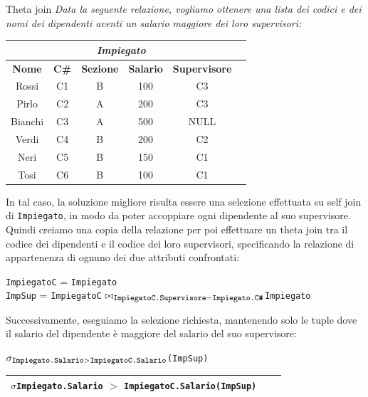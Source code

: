 \begin{Example}{Theta join}{}
    \textit{Data la seguente relazione, vogliamo ottenere una lista dei codici e dei nomi dei dipendenti aventi un salario maggiore dei loro supervisori:}
     \begin{center}
        \begin{tabular}{|c|c|c|c|c|c|}
            \hline\multicolumn{5}{|c|}{\textit{Impiegato}}\\\hline
            \textbf{Nome} & \textbf{C\#} & \textbf{Sezione} & \textbf{Salario} & \textbf{Supervisore}\\\hline
            Rossi & C1 & B & 100 & C3\\
            Pirlo & C2 & A & 200 & C3\\
            Bianchi & C3 & A & 500 & NULL\\
            Verdi & C4 & B & 200 & C2\\
            Neri & C5 & B & 150 & C1\\
            Tosi & C6 & B & 100 & C1\\\hline
        \end{tabular}
    \end{center}
    In tal caso, la soluzione migliore risulta essere una selezione effettuata su self join di \verb|Impiegato|, in modo da poter accoppiare ogni dipendente al suo supervisore. Quindi creiamo una copia della relazione per poi effettuare un theta join tra il codice dei dipendenti e il codice dei loro supervisori, specificando la relazione di appartenenza di ognuno dei due attributi confrontati:
    \begin{center}
        \verb|ImpiegatoC| = \verb|Impiegato|\\
        \verb|ImpSup| = \verb|ImpiegatoC| $\bowtie_{\footnotesize\verb|ImpiegatoC.Supervisore| = \verb|Impiegato.C#|}$\verb|Impiegato|
    \end{center}
    Successivamente, eseguiamo la selezione richiesta, mantenendo solo le tuple dove il salario del dipendente è maggiore del salario del suo supervisore:
    \begin{center}
        $\sigma_{\footnotesize\verb|Impiegato.Salario| > \verb|ImpiegatoC.Salario|}$\verb|(ImpSup)|
    \end{center}
     \begin{center}
        \begin{tabular}{|c|c|c|c|c|c|c|c|c|c|c|c|}
            \hline\multicolumn{10}{|c|}{$\sigma${\scriptsize\Verb|Impiegato.Salario| $>$ \Verb|ImpiegatoC.Salario|}\Verb|(ImpSup)|}\\\hline

\end{tabular}
\end{center}
\end{Example}
